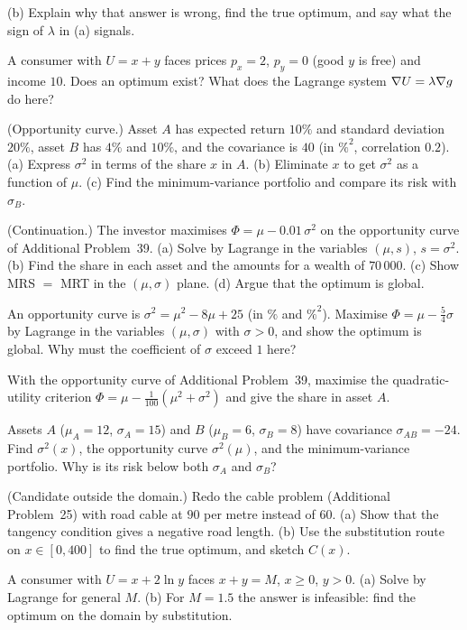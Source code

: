 \begin{problems}
        (b) Explain why that answer is wrong, find the true optimum, and
        say what the sign of $\lambda$ in (a) signals.
  \item A consumer with $U=x+y$ faces prices $p_x=2$, $p_y=0$ (good $y$ is
        free) and income $10$. Does an optimum exist? What does the Lagrange
        system $\nabla U=\lambda\nabla g$ do here?
  \item (Opportunity curve.) Asset $A$ has expected return $10\%$ and
        standard deviation $20\%$, asset $B$ has $4\%$ and $10\%$, and the
        covariance is $40$ (in $\%^{2}$, correlation $0.2$). (a) Express
        $\sigma^{2}$ in terms of the share $x$ in $A$. (b) Eliminate $x$ to
        get $\sigma^{2}$ as a function of $\mu$. (c) Find the
        minimum-variance portfolio and compare its risk with $\sigma_B$.
  \item (Continuation.) The investor maximises $\Phi=\mu-0.01\,\sigma^{2}$
        on the opportunity curve of Additional Problem~39. (a) Solve by Lagrange in
        the variables $(\mu,s)$, $s=\sigma^{2}$. (b) Find the share in each
        asset and the amounts for a wealth of $70\,000$. (c) Show
        MRS $=$ MRT in the $(\mu,\sigma)$ plane. (d) Argue that the optimum
        is global.
  \item An opportunity curve is $\sigma^{2}=\mu^{2}-8\mu+25$ (in $\%$ and
        $\%^{2}$). Maximise $\Phi=\mu-\tfrac54\sigma$ by Lagrange in the
        variables $(\mu,\sigma)$ with $\sigma>0$, and show the optimum is
        global. Why must the coefficient of $\sigma$ exceed $1$ here?
  \item With the opportunity curve of Additional Problem~39, maximise the
        quadratic-utility criterion $\Phi=\mu-\tfrac{1}{100}(\mu^{2}+\sigma^{2})$
        and give the share in asset $A$.
  \item Assets $A$ ($\mu_A=12$, $\sigma_A=15$) and $B$ ($\mu_B=6$,
        $\sigma_B=8$) have covariance $\sigma_{AB}=-24$. Find
        $\sigma^{2}(x)$, the opportunity curve $\sigma^{2}(\mu)$, and the
        minimum-variance portfolio. Why is its risk below both $\sigma_A$
        and $\sigma_B$?
  \item (Candidate outside the domain.) Redo the cable problem
        (Additional Problem~25) with road cable at $90$ per metre instead of $60$.
        (a) Show that the tangency condition gives a negative road length.
        (b) Use the substitution route on $x\in[0,400]$ to find the true
        optimum, and sketch $C(x)$.
  \item A consumer with $U=x+2\ln y$ faces $x+y=M$, $x\ge0$, $y>0$.
        (a) Solve by Lagrange for general $M$. (b) For $M=1.5$ the answer is
        infeasible: find the optimum on the domain by substitution.
\end{problems}

